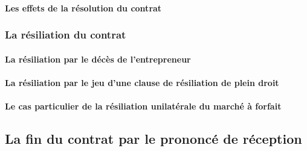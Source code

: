 				\paragraph{Les effets de la résolution du contrat}
			
			\subsubsection{La résiliation du contrat}
			
				\paragraph{La résiliation par le décès de l'entrepreneur}
				
				\paragraph{La résiliation par le jeu d'une clause de résiliation de plein droit}
				
				\paragraph{Le cas particulier de la résiliation unilatérale du marché à forfait}
		
		\subsection{La fin du contrat par le prononcé de réception}